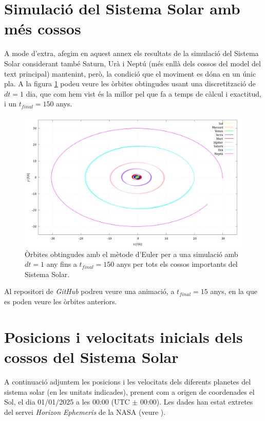 \documentclass[10pt, twoside, a4paper]{article}
\begin{document}
\section{Simulació del Sistema Solar amb més cossos}
\label{an:b}
A mode d'extra, afegim en aquest annex els resultats de la simulació del Sistema Solar considerant també Saturn, Urà i Neptú (més enllà dels cossos del model del text principal) mantenint, però, la condició que el moviment es dóna en un únic pla. A la figura \ref{fig:an1} podeu veure les òrbites obtingudes usant una discretització de $dt=1$ dia, que com hem vist és la millor pel que fa a temps de càlcul i exactitud, i un $t_{final}=150$ anys.

\begin{figure}[h]
    \centering
    \includegraphics[width=1.0\linewidth]{../sist_solar/orbites_euler_TOTS_150_d1dia.png}
    \caption{Òrbites obtingudes amb el mètode d'Euler per a una simulació amb $dt=1$ any fins a $t_{final}=150$ anys per tots els cossos importants del Sistema Solar.}
    \label{fig:an1}
\end{figure}

Al repositori de \textit{GitHub} podreu veure una animació, a $t_{final}=15$ anys, en la que es poden veure les òrbites anteriors.

\section{Posicions i velocitats inicials dels cossos del Sistema Solar}
\label{an:c}
A continuació adjuntem les posicions i les velocitats dels diferents planetes del sistema solar (en les unitats indicades), prenent com a origen de coordenades el Sol, el dia 01/01/2025 a les 00:00 (UTC $\pm$ 00:00). Les dades han estat extretes del servei \textit{Horizon Ephemeris} de la NASA (veure \cite{ref3}).
\end{document}
